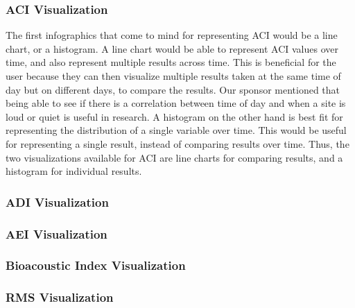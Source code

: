 \subsubsection{ACI Visualization}
The first infographics that come to mind for representing ACI would be a line chart, or a histogram. A line chart would be able to represent ACI values over time, and also represent multiple results across time. This is beneficial for the user because they can then visualize multiple results taken at the same time of day but on different days, to compare the results. Our sponsor mentioned that being able to see if there is a correlation between time of day and when a site is loud or quiet is useful in research. A histogram on the other hand is best fit for representing the distribution of a single variable over time. This would be useful for representing a single result, instead of comparing results over time. Thus, the two visualizations available for ACI are line charts for comparing results, and a histogram for individual results.

\subsubsection{ADI Visualization}

\subsubsection{AEI Visualization}

\subsubsection{Bioacoustic Index Visualization}

\subsubsection{RMS Visualization}
